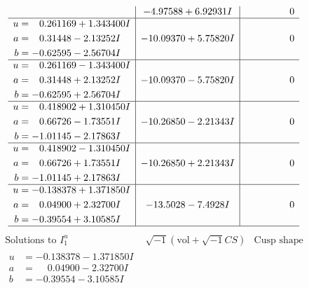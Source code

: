 \documentclass[1p]{elsarticle_modified}
\theoremstyle{definition}
\newcommand{\I}{\sqrt{-1}}
\begin{document}
$$\begin{array}{c|c|c}
 & -4.97588 + 6.92931 I & \phantom{-0.000000 } 0 \\ \hline\begin{aligned}
u &= \phantom{-}0.261169 + 1.343400 I \\
a &= \phantom{-}0.31448 - 2.13252 I \\
b &= -0.62595 - 2.56704 I\end{aligned}
 & -10.09370 + 5.75820 I & \phantom{-0.000000 } 0 \\ \hline\begin{aligned}
u &= \phantom{-}0.261169 - 1.343400 I \\
a &= \phantom{-}0.31448 + 2.13252 I \\
b &= -0.62595 + 2.56704 I\end{aligned}
 & -10.09370 - 5.75820 I & \phantom{-0.000000 } 0 \\ \hline\begin{aligned}
u &= \phantom{-}0.418902 + 1.310450 I \\
a &= \phantom{-}0.66726 - 1.73551 I \\
b &= -1.01145 - 2.17863 I\end{aligned}
 & -10.26850 - 2.21343 I & \phantom{-0.000000 } 0 \\ \hline\begin{aligned}
u &= \phantom{-}0.418902 - 1.310450 I \\
a &= \phantom{-}0.66726 + 1.73551 I \\
b &= -1.01145 + 2.17863 I\end{aligned}
 & -10.26850 + 2.21343 I & \phantom{-0.000000 } 0 \\ \hline\begin{aligned}
u &= -0.138378 + 1.371850 I \\
a &= \phantom{-}0.04900 + 2.32700 I \\
b &= -0.39554 + 3.10585 I\end{aligned}
 & -13.5028 - 7.4928 I & \phantom{-0.000000 } 0\\
 \hline 
 \end{array}$$\newpage$$\begin{array}{c|c|c}  
\text{Solutions to }I^u_{1}& \I (\text{vol} + \sqrt{-1}CS) & \text{Cusp shape}\\
 \hline 
\begin{aligned}
u &= -0.138378 - 1.371850 I \\
a &= \phantom{-}0.04900 - 2.32700 I \\
b &= -0.39554 - 3.10585 I\end{aligned}

\end{array}$$
\end{document}
